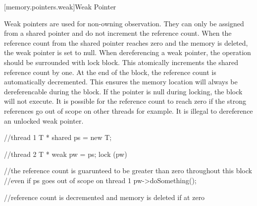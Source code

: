 [memory.pointers.weak]{Weak Pointer}

Weak pointers are used for non-owning observation. They can only be assigned from a shared pointer and do not increment the reference count. When the reference count from the shared pointer reaches zero and the memory is deleted, the weak pointer is set to null. When dereferencing a weak pointer, the operation should be surrounded with lock block. This atomically increments the shared reference count by one. At the end of the block, the reference count is automatically decremented. This ensures the memory location will always be dereferencable during the block. If the pointer is null during locking, the block will not execute. It is possible for the reference count to reach zero if the strong references go out of scope on other threads for example. It is illegal to dereference an unlocked weak pointer.

\begin{codeblock}

//thread 1
T * shared ps = new T;


//thread 2
T * weak pw = ps;
lock (pw)	
{
	//the reference count is guarunteed to be greater than zero throughout this block
	//even if ps goes out of scope on thread 1
	pw->doSomething();
	
} //reference count is decremented and memory is deleted if at zero


\end{codeblock}